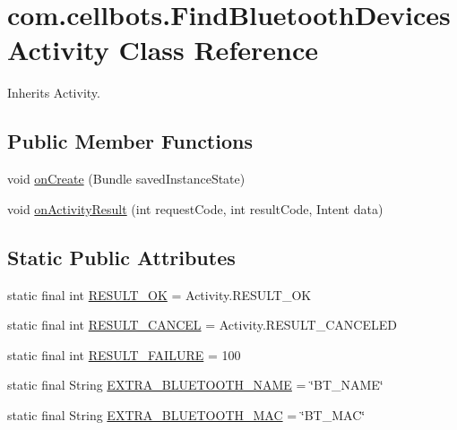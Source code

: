 \hypertarget{classcom_1_1cellbots_1_1_find_bluetooth_devices_activity}{\section{com.\-cellbots.\-Find\-Bluetooth\-Devices\-Activity Class Reference}
\label{classcom_1_1cellbots_1_1_find_bluetooth_devices_activity}
}


Inherits Activity.

\subsection*{Public Member Functions}
\begin{DoxyCompactItemize}
\item 
void \hyperlink{classcom_1_1cellbots_1_1_find_bluetooth_devices_activity_a0b79c46f43f62d587dea52763f78cd46}{on\-Create} (Bundle saved\-Instance\-State)
\item 
void \hyperlink{classcom_1_1cellbots_1_1_find_bluetooth_devices_activity_a81083b11573d218dff9c071966ce93bd}{on\-Activity\-Result} (int request\-Code, int result\-Code, Intent data)
\end{DoxyCompactItemize}
\subsection*{Static Public Attributes}
\begin{DoxyCompactItemize}
\item 
static final int \hyperlink{classcom_1_1cellbots_1_1_find_bluetooth_devices_activity_a391fbb01516687971bd2cbee8bd05821}{R\-E\-S\-U\-L\-T\-\_\-\-O\-K} = Activity.\-R\-E\-S\-U\-L\-T\-\_\-\-O\-K
\item 
static final int \hyperlink{classcom_1_1cellbots_1_1_find_bluetooth_devices_activity_a535f4faa23ecba2dd67620609be6f52c}{R\-E\-S\-U\-L\-T\-\_\-\-C\-A\-N\-C\-E\-L} = Activity.\-R\-E\-S\-U\-L\-T\-\_\-\-C\-A\-N\-C\-E\-L\-E\-D
\item 
static final int \hyperlink{classcom_1_1cellbots_1_1_find_bluetooth_devices_activity_a3bbfb6974f0bf71c2bb4b7d0ffc946c8}{R\-E\-S\-U\-L\-T\-\_\-\-F\-A\-I\-L\-U\-R\-E} = 100
\item 
static final String \hyperlink{classcom_1_1cellbots_1_1_find_bluetooth_devices_activity_ac5acfff2da87cd650ab4e6120088d421}{E\-X\-T\-R\-A\-\_\-\-B\-L\-U\-E\-T\-O\-O\-T\-H\-\_\-\-N\-A\-M\-E} = \char`\"{}B\-T\-\_\-\-N\-A\-M\-E\char`\"{}
\item 
static final String \hyperlink{classcom_1_1cellbots_1_1_find_bluetooth_devices_activity_a30ab2636d45c040d62c28f30f21fa64c}{E\-X\-T\-R\-A\-\_\-\-B\-L\-U\-E\-T\-O\-O\-T\-H\-\_\-\-M\-A\-C} = \char`\"{}B\-T\-\_\-\-M\-A\-C\char`\"{}
\end{DoxyCompactItemize}
